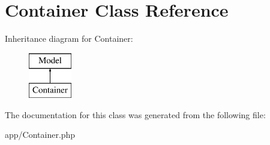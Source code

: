 \hypertarget{class_app_1_1_container}{}\section{Container Class Reference}
\label{class_app_1_1_container}
Inheritance diagram for Container\+:\begin{figure}[H]
\begin{center}
\leavevmode
\includegraphics[height=2.000000cm]{class_app_1_1_container}
\end{center}
\end{figure}


The documentation for this class was generated from the following file\+:\begin{DoxyCompactItemize}
\item 
app/Container.\+php\end{DoxyCompactItemize}
